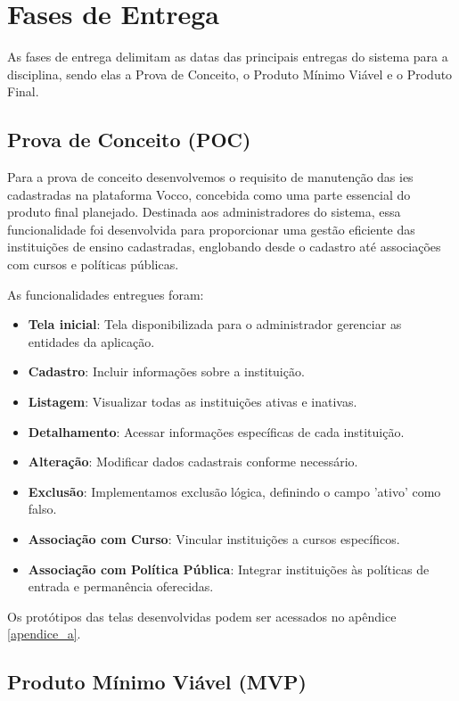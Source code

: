 \section{Fases de Entrega}

As fases de entrega delimitam as datas das principais entregas do sistema para a disciplina, sendo elas a Prova de Conceito, o Produto Mínimo Viável e o Produto Final.

\subsection{ Prova de Conceito (POC)}

Para a prova de conceito desenvolvemos o requisito de manutenção das \ac{ies} cadastradas na plataforma Vocco, concebida como uma parte essencial do produto final planejado. Destinada aos administradores do sistema, essa funcionalidade foi desenvolvida para proporcionar uma gestão eficiente das instituições de ensino cadastradas, englobando desde o cadastro até associações com cursos e políticas públicas. 

As funcionalidades entregues foram:

\begin{itemize}
    \item \textbf{Tela inicial}: Tela disponibilizada para o administrador gerenciar as entidades da aplicação.
    \item \textbf{Cadastro}: Incluir informações sobre a instituição. 
    \item \textbf{Listagem}: Visualizar todas as instituições ativas e inativas.
    \item \textbf{Detalhamento}: Acessar informações específicas de cada instituição.
    \item \textbf{Alteração}: Modificar dados cadastrais conforme necessário.
    \item \textbf{Exclusão}: Implementamos exclusão lógica, definindo o campo 'ativo' como falso. 
    \item \textbf{Associação com Curso}: Vincular instituições a cursos específicos.
    \item \textbf{Associação com Política Pública}: Integrar instituições às políticas de entrada e permanência oferecidas.
\end{itemize}

 Os protótipos das telas desenvolvidas podem ser acessados no apêndice \ref{apendice_a}.


\subsection{Produto Mínimo Viável (MVP)}

